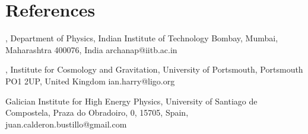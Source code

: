 \documentclass[a4paper]{comcv}
\begin{document}
    \section{References}
    \vspace{0.7cm}
    \begin{tightlist}
        \item{, 
        \newline{}
        \rm{Department of Physics},
        \newline{}
        \rm{Indian Institute of Technology Bombay},
        \newline{}
        Mumbai, Maharashtra 400076, India
        \newline{}
        archanap@iitb.ac.in
        }
        \item {,
        \newline{}
        \rm{Institute for Cosmology and Gravitation},
        \newline{}
        University of Portsmouth,
        \newline{}
        Portsmouth PO1 2UP, United Kingdom
        \newline{}
        ian.harry@ligo.org
        }
        \item{
        \newline{}
        \rm{Galician Institute for High Energy Physics},
        \newline{}
        University of Santiago de Compostela,
        \newline{}
        Praza do Obradoiro, 0, 15705, Spain,
        \newline{}
        juan.calderon.bustillo@gmail.com}
    \end{tightlist}
\end{document}
